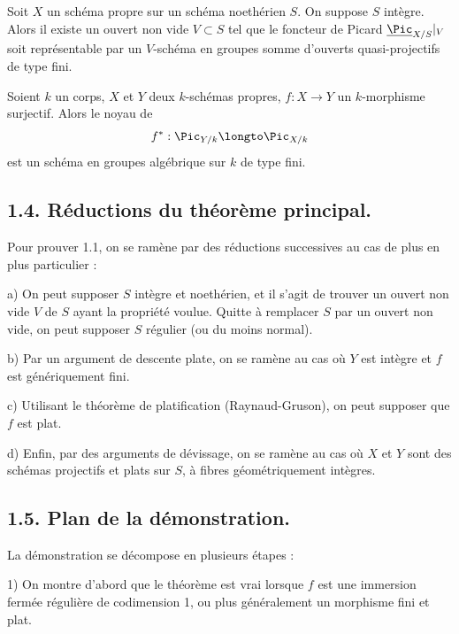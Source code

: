 \begin{corollaire}[1.2]
Soit $X$ un sch\'ema propre sur un sch\'ema noeth\'erien $S$. On suppose $S$ int\`egre. Alors il existe un ouvert non vide $V \subset S$ tel que le foncteur de Picard $\underline{\Pic}_{X/S}|_{V}$ soit repr\'esentable par un $V$-sch\'ema en groupes somme d'ouverts quasi-projectifs de type fini.
\end{corollaire}

\begin{corollaire}[1.3]
Soient $k$ un corps, $X$ et $Y$ deux $k$-sch\'emas propres, $f : X \to Y$ un $k$-morphisme surjectif. Alors le noyau de
\[
f^{*} : \Pic_{Y/k} \longto \Pic_{X/k}
\]
est un sch\'ema en groupes alg\'ebrique sur $k$ de type fini.
\end{corollaire}

\subsection*{1.4. R\'eductions du th\'eor\`eme principal.}

Pour prouver 1.1, on se ram\`ene par des r\'eductions successives au cas de plus en plus particulier :

a) On peut supposer $S$ int\`egre et noeth\'erien, et il s'agit de trouver un ouvert non vide $V$ de $S$ ayant la propri\'et\'e voulue. Quitte \`a remplacer $S$ par un ouvert non vide, on peut supposer $S$ r\'egulier (ou du moins normal).

b) Par un argument de descente plate, on se ram\`ene au cas o\`u $Y$ est int\`egre et $f$ est g\'en\'eriquement fini.

c) Utilisant le th\'eor\`eme de platification (Raynaud-Gruson), on peut supposer que $f$ est plat.

d) Enfin, par des arguments de d\'evissage, on se ram\`ene au cas o\`u $X$ et $Y$ sont des sch\'emas projectifs et plats sur $S$, \`a fibres g\'eom\'etriquement int\`egres.

\subsection*{1.5. Plan de la d\'emonstration.}

La d\'emonstration se d\'ecompose en plusieurs \'etapes :

1) On montre d'abord que le th\'eor\`eme est vrai lorsque $f$ est une immersion ferm\'ee r\'eguli\`ere de codimension 1, ou plus g\'en\'eralement un morphisme fini et plat.


